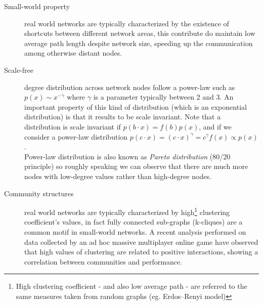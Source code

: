 \begin{description}

\item[Small-world property] real world networks are typically characterized  by the existence of shortcuts between different network areas, this contribute do maintain low average path length despite network size\cite{citeulike:481248}, speeding up the communication among otherwise distant nodes.

\item[Scale-free] degree distribution across network nodes follow a power-law such as $p(x) \sim x^{-\gamma}$ where $\gamma$ is a parameter typically between 2 and 3. An important property of this kind of distribution (which is an exponential distribution) is that it results to be scale invariant. Note that a distribution is scale invariant if $p(b \cdot x) = f(b) p(x)$, and if we consider a power-law distribution $p(c \cdot x) = (c \cdot x)^\gamma = c^\gamma f(x) \propto p(x)$.\\ 
Power-law distribution is also known as \emph{Pareto distribution} (80/20 principle) so roughly speaking we can observe that there are much more nodes with low-degree values rather than high-degree nodes.

\item[Community structures] real world networks are typically characterized by high\footnote{High clustering coefficient - and also low average path - are referred to the same measures taken from random graphs (eg. Erdos–Renyi model) } clustering coefficient's values, in fact fully connected sub-graphs (k-cliques) are a common motif in small-world networks\cite{citeulike:481248}. A recent analysis performed on data collected by an ad hoc massive multiplayer online game\cite{citeulike:6926207} have observed that high values of clustering are related to positive interactions, showing a correlation between communities and performance.

\end{description}

